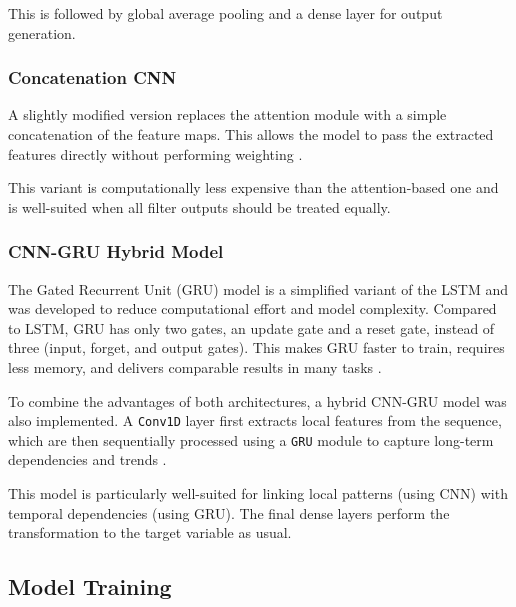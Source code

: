 This is followed by global average pooling and a dense layer for output generation.



\subsubsection{Concatenation CNN}

A slightly modified version replaces the attention module with a simple concatenation of the feature maps.
This allows the model to pass the extracted features directly without performing weighting \cite{keras-concat}.

This variant is computationally less expensive than the attention-based one and is well-suited when all filter outputs should be treated equally.



\subsubsection{CNN-GRU Hybrid Model}

The Gated Recurrent Unit (GRU) model is a simplified variant of the LSTM and was developed to reduce computational effort and model complexity.
Compared to LSTM, GRU has only two gates, an update gate and a reset gate, instead of three (input, forget, and output gates).
This makes GRU faster to train, requires less memory, and delivers comparable results in many tasks \cite{gru-basics}.

To combine the advantages of both architectures, a hybrid CNN-GRU model was also implemented.
A \texttt{Conv1D} layer first extracts local features from the sequence, which are then sequentially processed using a \texttt{GRU} module to capture long-term dependencies and trends \cite{cnn-gru}.

This model is particularly well-suited for linking local patterns (using CNN) with temporal dependencies (using GRU).
The final dense layers perform the transformation to the target variable as usual.



\subsection{Model Training}

